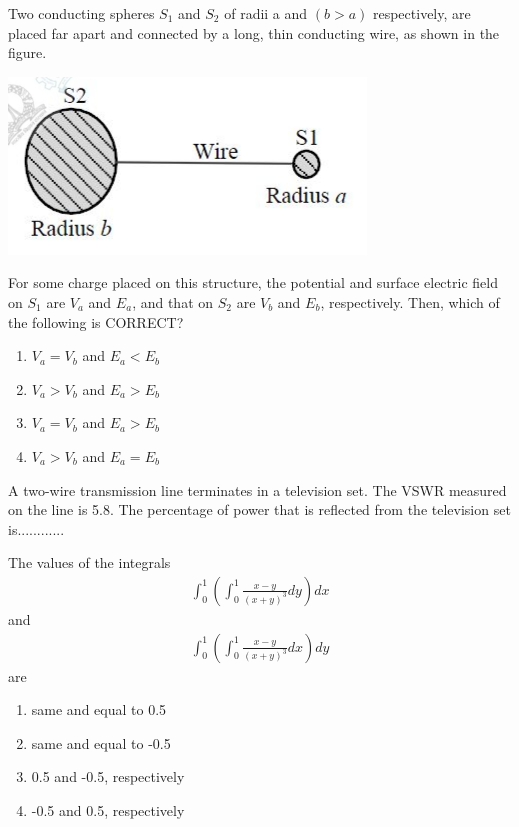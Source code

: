 \item Two conducting spheres $S_1$ and $S_2$ of radii a and $(b > a)$ respectively, are placed far apart and connected by a long, thin conducting wire, as shown in the figure.

\includegraphics[scale=0.5]{24}

For some charge placed on this structure, the potential and surface electric field on $S_{1}$ are $V_{a}$ and $E_{a}$, and that on $S_{2}$ are $V_{b}$ and $E_{b}$, respectively. Then, which of the following is CORRECT?
\begin{enumerate}
\item $V_{a} = V_{b}$ and $E_{a} < E_{b}$
\item $V_{a} > V_{b}$ and $E_{a} > E_{b}$
\item $V_{a} = V_{b}$ and $E_{a} > E_{b}$
\item $V_{a} > V_{b}$ and $E_{a} = E_{b}$
\end{enumerate}

\item A two-wire transmission line terminates in a television set. The VSWR measured on the line is 5.8. The percentage of power that is reflected from the television set is............


\item The values of the integrals
\begin{align*}
\int_{0}^{1}\left(\int_{0}^{1}\frac{x - y}{(x + y)^{3}}dy\right)dx
\end{align*}
and
\begin{align*}
\int_{0}^{1}\left(\int_{0}^{1}\frac{x - y}{(x + y)^{3}}dx\right)dy
\end{align*}
are
\begin{enumerate}
\item same and equal to 0.5
\item same and equal to -0.5
\item 0.5 and -0.5, respectively
\item -0.5 and 0.5, respectively
\end{enumerate}

